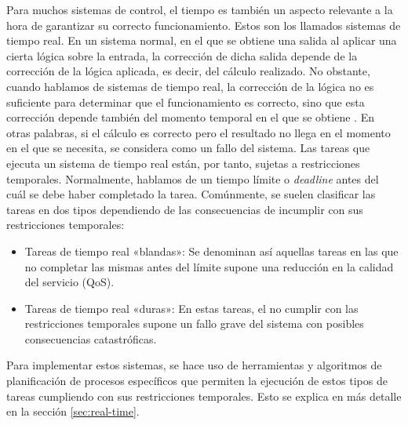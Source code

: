 Para muchos sistemas de control, el tiempo es también un aspecto relevante a la
hora de garantizar su correcto funcionamiento. Estos son los llamados sistemas
de tiempo real. En un sistema normal, en el que se obtiene una salida al aplicar
una cierta lógica sobre la entrada, la corrección de dicha salida depende de la
corrección de la lógica aplicada, es decir, del cálculo realizado. No obstante,
cuando hablamos de sistemas de tiempo real, la corrección de la lógica no es
suficiente para determinar que el funcionamiento es correcto, sino que esta
corrección depende también del momento temporal en el que se obtiene
\cite{gambier_real-time_2004}. En otras palabras, si el cálculo es correcto pero
el resultado no llega en el momento en el que se necesita, se considera como un
fallo del sistema. Las tareas que ejecuta un sistema de tiempo real están, por
tanto, sujetas a restricciones temporales. Normalmente, hablamos de un tiempo
límite o \textit{deadline} antes del cuál se debe haber completado la tarea.
Comúnmente, se suelen clasificar las tareas en dos tipos dependiendo de las
consecuencias de incumplir con sus restricciones temporales:

\begin{itemize}
  \item Tareas de tiempo real «blandas»: Se denominan así aquellas tareas en las
        que no completar las mismas antes del límite supone una reducción en la
        calidad del servicio (QoS).
  \item Tareas de tiempo real «duras»: En estas tareas, el no cumplir con las
        restricciones temporales supone un fallo grave del sistema con posibles
        consecuencias catastróficas.
\end{itemize}

Para implementar estos sistemas, se hace uso de herramientas y algoritmos de
planificación de procesos específicos que permiten la ejecución de estos tipos
de tareas cumpliendo con sus restricciones temporales. Esto se explica en más
detalle en la sección \ref{sec:real-time}.

